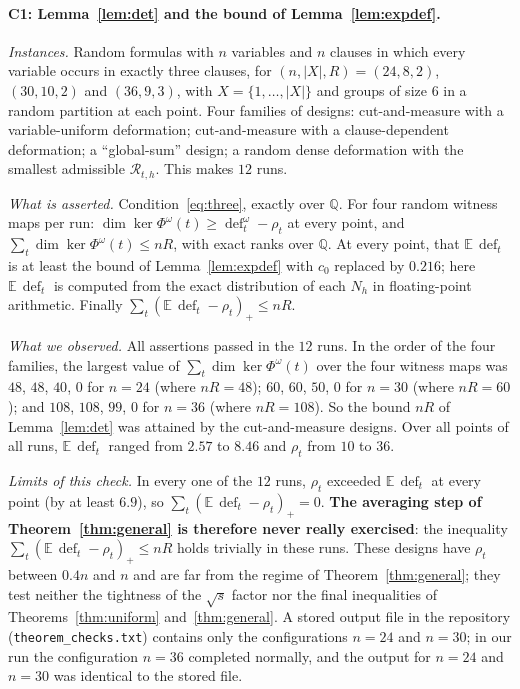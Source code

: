 \documentclass[11pt,a4paper]{article}
\theoremstyle{definition}
\theoremstyle{remark}
\newcommand{\Q}{\mathbb{Q}}
\newcommand{\E}{\mathbb{E}}
\newcommand{\cR}{\mathcal{R}}
\newcommand{\dfc}{\operatorname{def}}
\begin{document}
\paragraph{C1: Lemma~\ref{lem:det} and the bound of Lemma~\ref{lem:expdef}.}
\emph{Instances.} Random formulas with $n$ variables and $n$ clauses in which every variable
occurs in exactly three clauses, for $(n,|X|,R)=(24,8,2)$, $(30,10,2)$ and $(36,9,3)$, with
$X=\{1,\dots,|X|\}$ and groups of size $6$ in a random partition at each point. Four families
of designs: cut-and-measure with a variable-uniform deformation; cut-and-measure with a
clause-dependent deformation; a ``global-sum'' design; a random dense deformation with the
smallest admissible $\cR_{t,h}$. This makes $12$ runs.

\emph{What is asserted.} Condition~\eqref{eq:three}, exactly over $\Q$. For four random
witness maps per run: $\dim\ker\Phi^\omega(t)\ge\dfc^\omega_t-\rho_t$ at every point, and
$\sum_t\dim\ker\Phi^\omega(t)\le nR$, with exact ranks over $\Q$. At every point, that
$\E\,\dfc_t$ is at least the bound of Lemma~\ref{lem:expdef} with $c_0$ replaced by $0.216$;
here $\E\,\dfc_t$ is computed from the exact distribution of each $N_h$ in floating-point
arithmetic. Finally $\sum_t(\E\,\dfc_t-\rho_t)_+\le nR$.

\emph{What we observed.} All assertions passed in the $12$ runs. In the order of the four families, the largest value of
$\sum_t\dim\ker\Phi^\omega(t)$ over the four witness maps was $48$, $48$, $40$, $0$ for
$n=24$ (where $nR=48$); $60$, $60$, $50$, $0$ for $n=30$ (where $nR=60$); and $108$, $108$,
$99$, $0$ for $n=36$ (where $nR=108$). So the bound $nR$ of Lemma~\ref{lem:det} was attained by the
cut-and-measure designs. Over all points of all runs, $\E\,\dfc_t$ ranged from $2.57$ to
$8.46$ and $\rho_t$ from $10$ to $36$.

\emph{Limits of this check.} In every one of the $12$ runs, $\rho_t$ exceeded $\E\,\dfc_t$
at every point (by at least $6.9$), so $\sum_t(\E\,\dfc_t-\rho_t)_+=0$. \textbf{The
averaging step of Theorem~\ref{thm:general} is therefore never really exercised}: the
inequality $\sum_t(\E\,\dfc_t-\rho_t)_+\le nR$ holds trivially in these runs. These designs
have $\rho_t$ between $0.4n$ and $n$ and are far from the regime of
Theorem~\ref{thm:general}; they test neither the tightness of the $\sqrt s$ factor nor the
final inequalities of Theorems~\ref{thm:uniform} and~\ref{thm:general}. A stored output
file in the repository (\texttt{theorem\_checks.txt}) contains only the configurations
$n=24$ and $n=30$; in our run the configuration $n=36$ completed normally, and the output
for $n=24$ and $n=30$ was identical to the stored file.
\end{document}
